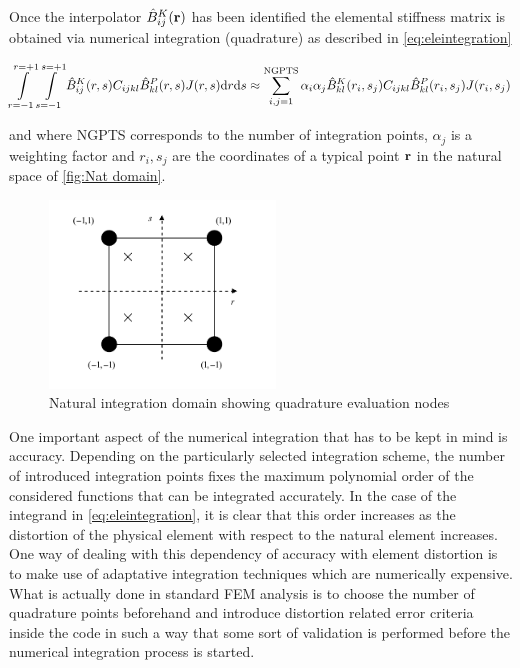 Once the interpolator $\hat{B}_{ij}^K(\vb{r})$ has been identified the elemental stiffness matrix is obtained via numerical integration (quadrature) as described in \eqref{eq:eleintegration}

\begin{equation}
\int\limits_{r=-1}^{r=+1}\int\limits_{s=-1}^{s=+1} \hat{B}_{ij}^K(r,s) C_{ijkl} \hat{B}_{kl}^P(r,s)J(r,s) \mathrm{d}r\mathrm{d}s\approx \sum_{i,j=1}^\text{NGPTS} \alpha_i \alpha_j \hat{B}_{kl}^K(r_i,s_j)C_{ijkl} \hat{B}_{kl}^P(r_i,s_j) J(r_i,s_j)
\label{eq:eleintegration}
\end{equation}


and where NGPTS corresponds to the number of integration points, $\alpha_j$ is a weighting factor and $r_i,s_j$   are the coordinates of a typical point $\vb{r}$ in the natural space of \cref{fig:Nat domain}.

 
\begin{figure}[h]
\centering
\includegraphics[width=6cm]{img/figure4.pdf}
\caption{Natural integration domain showing quadrature evaluation nodes}
\label{fig:integration domain}
\end{figure}	 


One important aspect of the numerical integration that has to be kept in mind is accuracy.  Depending on the particularly selected integration scheme, the number of introduced integration points fixes the maximum polynomial order of the considered functions that can be integrated accurately.  In the case of the integrand in \cref{eq:eleintegration}, it is clear that this order increases as the distortion of the physical element  with respect to the natural element increases.  One way of dealing with this dependency of accuracy with element distortion is to make use of adaptative integration techniques which are numerically expensive.  What is actually done in standard FEM analysis is to choose the number of quadrature points beforehand and introduce distortion related error criteria inside the code in such a way that some sort of validation is performed before the numerical integration process is started.


